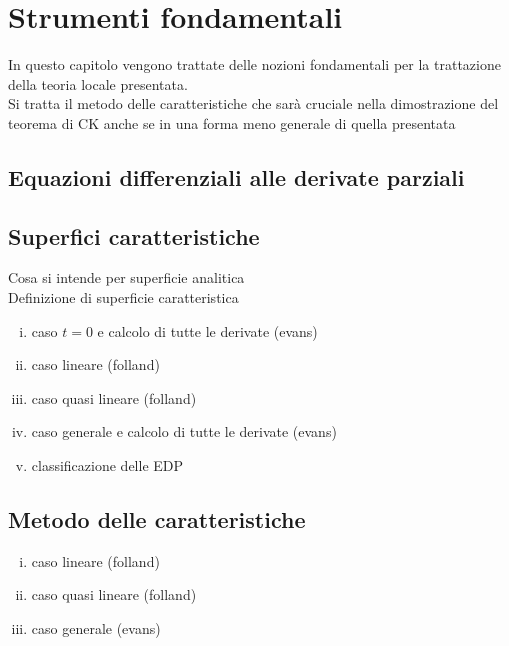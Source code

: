 \chapter{Strumenti fondamentali}
In questo capitolo vengono trattate delle nozioni fondamentali per la trattazione della teoria locale presentata.\\
Si tratta il metodo delle caratteristiche che sarà cruciale nella dimostrazione del teorema di CK anche se in una forma meno generale di quella presentata

\section{Equazioni differenziali alle derivate parziali}
\section{Superfici caratteristiche}
Cosa si intende per superficie analitica\\
Definizione di superficie caratteristica

\begin{enumerate}[i.]
\item
caso $t=0$ e calcolo di tutte le derivate (evans)
\item
caso lineare (folland)
\item
caso quasi lineare (folland)
\item
caso generale e calcolo di tutte le derivate (evans)
\item 
classificazione delle EDP
\end{enumerate}


\section{Metodo delle caratteristiche}

\begin{enumerate}[i.]
\item
caso lineare (folland)
\item
caso quasi lineare (folland)
\item
caso generale (evans)
\end{enumerate}
